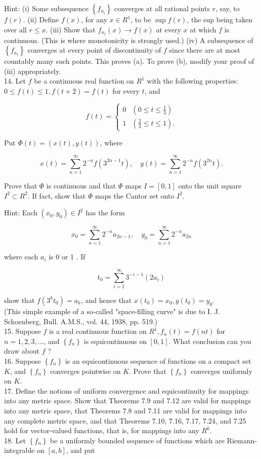 \documentclass[10pt]{article}
\begin{document}
Hint: (i) Some subsequence $\left\{f_{n_{i}}\right\}$ converges at all rational points $r$, say, to $f(r)$. (ii) Define $f(x)$, for any $x \in R^{1}$, to be $\sup f(r)$, the sup being taken over all $r \leq x$. (iii) Show that $f_{n_{t}}(x) \rightarrow f(x)$ at every $x$ at which $f$ is continuous. (This is where monotonicity is strongly used.) (iv) A subsequence of $\left\{f_{n_{i}}\right\}$ converges at every point of discontinuity of $f$ since there are at most countably many such points. This proves (a). To prove (b), modify your proof of (iii) appropriately.\\
14. Let $f$ be a continuous real function on $R^{1}$ with the following properties: $0 \leq f(t) \leq 1, f(t+2)=f(t)$ for every $t$, and

$$
f(t)= \begin{cases}0 & \left(0 \leq t \leq \frac{1}{3}\right) \\ 1 & \left(\frac{2}{3} \leq t \leq 1\right) .\end{cases}
$$

Put $\Phi(t)=(x(t), y(t))$, where

$$
x(t)=\sum_{n=1}^{\infty} 2^{-n} f\left(3^{2 n-1} t\right), \quad y(t)=\sum_{n=1}^{\infty} 2^{-n} f\left(3^{2 n} t\right) .
$$

Prove that $\Phi$ is continuous and that $\Phi$ maps $I=[0,1]$ onto the unit square $I^{2} \subset R^{2}$. If fact, show that $\Phi$ maps the Cantor set onto $I^{2}$.

Hint: Each $\left(x_{0}, y_{0}\right) \in I^{2}$ has the form

$$
x_{0}=\sum_{n=1}^{\infty} 2^{-n} a_{2 n-1}, \quad y_{0}=\sum_{n=1}^{\infty} 2^{-n} a_{2 n}
$$

where each $a_{i}$ is 0 or 1 . If

$$
t_{0}=\sum_{i=1}^{\infty} 3^{-i-1}\left(2 a_{i}\right)
$$

show that $f\left(3^{k} t_{0}\right)=a_{k}$, and hence that $x\left(t_{0}\right)=x_{0}, y\left(t_{0}\right)=y_{0}$.\\
(This simple example of a so-called "space-filling curve" is due to I. J. Schoenberg, Bull. A.M.S., vol. 44, 1938, pp. 519.)\\
15. Suppose $f$ is a real continuous function on $R^{1}, f_{n}(t)=f(n t)$ for $n=1,2,3, \ldots$, and $\left\{f_{n}\right\}$ is equicontinuous on $[0,1]$. What conclusion can you draw about $f$ ?\\
16. Suppose $\left\{f_{n}\right\}$ is an equicontinuous sequence of functions on a compact set $K$, and $\left\{f_{n}\right\}$ converges pointwise on $K$. Prove that $\left\{f_{n}\right\}$ converges uniformly on $K$.\\
17. Define the notions of uniform convergence and equicontinuity for mappings into any metric space. Show that Theorems 7.9 and 7.12 are valid for mappings into any metric space, that Theorems 7.8 and 7.11 are valid for mappings into any complete metric space, and that Theorems 7.10, 7.16, 7.17, 7.24, and 7.25 hold for vector-valued functions, that is, for mappings into any $R^{k}$.\\
18. Let $\left\{f_{n}\right\}$ be a uniformly bounded sequence of functions which are Riemann-integrable on $[a, b]$, and put
\end{document}
